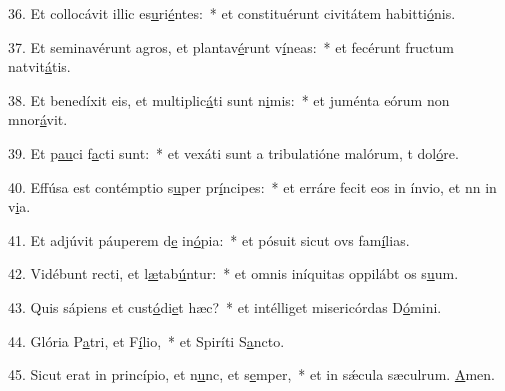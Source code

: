 36. Et collocávit illic es\uline{u}ri\uline{é}ntes:~* et constituérunt civitátem habitti\uline{ó}nis.\par 
37. Et seminavérunt agros, et plantav\uline{é}runt v\uline{í}neas:~* et fecérunt fructum natvit\uline{á}tis.\par 
38. Et benedíxit eis, et multiplic\uline{á}ti sunt n\uline{i}mis:~* et juménta eórum non mnor\uline{á}vit.\par 
39. Et p\uline{au}ci f\uline{a}cti sunt:~* et vexáti sunt a tribulatióne malórum, t dol\uline{ó}re.\par 
40. Effúsa est contémptio s\uline{u}per pr\uline{í}ncipes:~* et erráre fecit eos in ínvio, et nn in v\uline{i}a.\par 
41. Et adjúvit páuperem d\uline{e} in\uline{ó}pia:~* et pósuit sicut ovs fam\uline{í}lias.\par 
42. Vidébunt recti, et l\uline{æ}tab\uline{ú}ntur:~* et omnis iníquitas oppilábt os s\uline{u}um.\par 
43. Quis sápiens et cust\uline{ó}di\uline{e}t hæc?~* et intélliget misericórdas D\uline{ó}mini.\par 
44. Glória P\uline{a}tri, et F\uline{í}lio,~* et Spiríti S\uline{a}ncto.\par 
45. Sicut erat in princípio, et n\uline{u}nc, et s\uline{e}mper,~* et in sǽcula sæculrum. \uline{A}men.\par 
